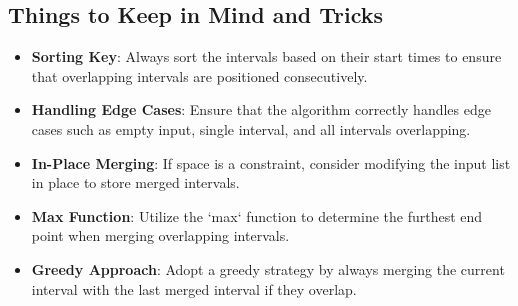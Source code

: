 \subsection*{Things to Keep in Mind and Tricks}
\begin{itemize}
    \item \textbf{Sorting Key}: Always sort the intervals based on their start times to ensure that overlapping intervals are positioned consecutively.
    
    \item \textbf{Handling Edge Cases}: Ensure that the algorithm correctly handles edge cases such as empty input, single interval, and all intervals overlapping.
    
    \item \textbf{In-Place Merging}: If space is a constraint, consider modifying the input list in place to store merged intervals.
    
    \item \textbf{Max Function}: Utilize the `max` function to determine the furthest end point when merging overlapping intervals.
    
    \item \textbf{Greedy Approach}: Adopt a greedy strategy by always merging the current interval with the last merged interval if they overlap.
\end{itemize}


